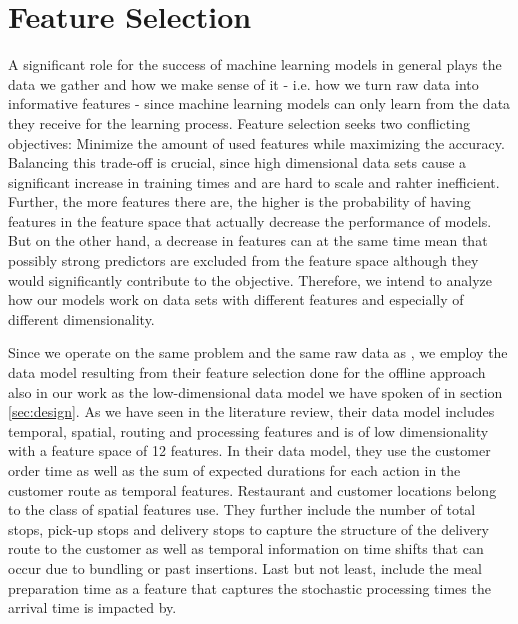 \section{Feature Selection}\label{sec:fs}

A significant role for the success of machine learning models in general plays the data we gather and how we make sense of it - i.e. how we turn raw data into informative features - since machine learning models can only learn from the data they receive for the learning process. Feature selection seeks two conflicting objectives: Minimize the amount of used features while maximizing the accuracy. Balancing this trade-off is crucial, since high dimensional data sets cause a significant increase in training times and are hard to scale and rahter inefficient. Further, the more features there are, the higher is the probability of having features in the feature space that actually decrease the performance of models. But on the other hand, a decrease in features can at the same time mean that possibly strong predictors are excluded from the feature space although they would significantly contribute to the objective. Therefore, we intend to analyze how our models work on data sets with different features and especially of different dimensionality.   

Since we operate on the same problem and the same raw data as \cite{Hildebrandt2020_EAT}, we employ the data model resulting from their feature selection done for the offline approach also in our work as the low-dimensional data model we have spoken of in section \ref{sec:design}. As we have seen in the literature review, their data model includes temporal, spatial, routing and processing features and is of low dimensionality with a feature space of 12 features.
In their data model, they use the customer order time as well as the sum of expected durations for each action in the customer route as temporal features. Restaurant and customer locations belong to the class of spatial features \cite{Hildebrandt2020_EAT} use. They further include the number of total stops, pick-up stops and delivery stops to capture the structure of the delivery route to the customer as well as temporal information on time shifts that can occur due to bundling or past insertions. Last but not least, \cite{Hildebrandt2020_EAT} include the meal preparation time as a feature that captures the stochastic processing times the arrival time is impacted by.

